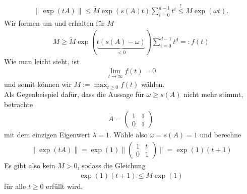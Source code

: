 \begin{solution}
\begin{align*}
  \|\exp(tA)\| \leq \widetilde{M}\exp(s(A)t)\sum_{i=0}^{d-1} t^i \stackrel{!}{\leq} M \exp(\omega t).
\end{align*}
Wir formen um und erhalten für $M$
\begin{align*}
  M\geq \widetilde{M} \exp(\underbrace{t(s(A) - \omega)}_{< 0})\sum_{i=0}^{d-1} t^d =: f(t)
\end{align*}
Wie man leicht sieht, ist
\begin{align*}
  \lim_{t \to \infty}f(t) = 0
\end{align*}
und somit können wir $M := \max_{t \geq 0} f(t)$ wählen. \\
Als Gegenbeispiel dafür, dass die Aussage für $\omega \geq s(A)$ nicht mehr stimmt,
betrachte
\begin{align*}
  A = \begin{pmatrix}
    1 & 1 \\ 0 & 1
  \end{pmatrix}
\end{align*}
mit dem einzigen Eigenwert $\lambda = 1$. Wähle also $\omega = s(A) = 1$ und berechne
\begin{align*}
  \|\exp(tA)\| = \exp(1)\|\begin{pmatrix}
    1 & t \\ 0 & 1
  \end{pmatrix}\|
  = \exp(1)(t+1)
\end{align*}
Es gibt also kein $M > 0$, sodass die Gleichung
\begin{align*}
  \exp(1)(t+1) \leq M \exp(1)
\end{align*}
für alle $t \geq 0$ erfüllt wird.
\end{solution}
